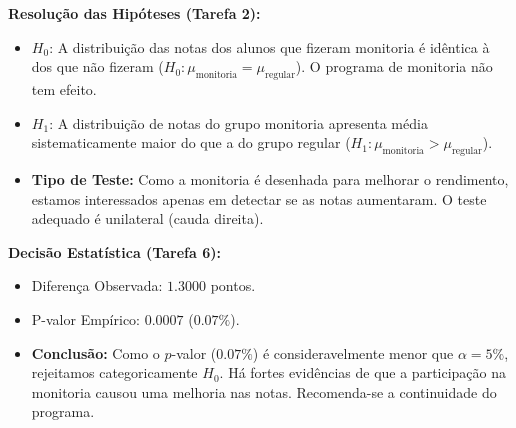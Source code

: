 \documentclass[12pt]{article}
\begin{document}
\begin{tcolorbox}[colback=yellow!10!white,colframe=yellow!50!black,title=\textbf{Gabarito das Tarefas Teóricas}]
\textbf{Resolução das Hipóteses (Tarefa 2):}
\begin{itemize}
    \item $H_0$: A distribuição das notas dos alunos que fizeram monitoria é idêntica à dos que não fizeram ($H_0: \mu_{\text{monitoria}} = \mu_{\text{regular}}$). O programa de monitoria não tem efeito.
    \item $H_1$: A distribuição de notas do grupo monitoria apresenta média sistematicamente maior do que a do grupo regular ($H_1: \mu_{\text{monitoria}} > \mu_{\text{regular}}$).
    \item \textbf{Tipo de Teste:} Como a monitoria é desenhada para melhorar o rendimento, estamos interessados apenas em detectar se as notas aumentaram. O teste adequado é unilateral (cauda direita).
\end{itemize}

\textbf{Decisão Estatística (Tarefa 6):}
\begin{itemize}
    \item Diferença Observada: $1.3000$ pontos.
    \item P-valor Empírico: $0.0007$ ($0.07\%$).
    \item \textbf{Conclusão:} Como o $p$-valor ($0.07\%$) é consideravelmente menor que $\alpha = 5\%$, rejeitamos categoricamente $H_0$. Há fortes evidências de que a participação na monitoria causou uma melhoria nas notas. Recomenda-se a continuidade do programa.
\end{itemize}
\end{tcolorbox}
\end{document}
